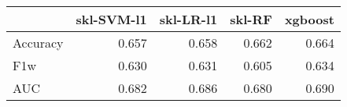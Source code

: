 \begin{tabular}{lrrrr}
\toprule
{} &  skl-SVM-l1 &  skl-LR-l1 &  skl-RF &  xgboost \\
\midrule
Accuracy &       0.657 &      0.658 &   0.662 &    0.664 \\
F1w      &       0.630 &      0.631 &   0.605 &    0.634 \\
AUC      &       0.682 &      0.686 &   0.680 &    0.690 \\
\bottomrule
\end{tabular}
